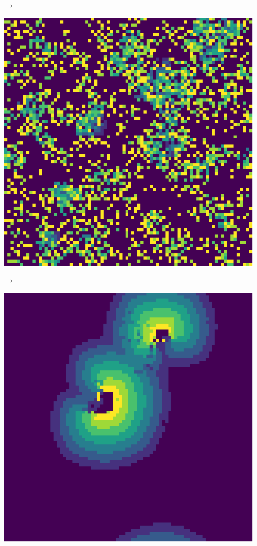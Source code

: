 \documentclass[12pt, a4paper]{article}
\begin{document}
\begin{center}
\begin{minipage}{.17\linewidth}
            \end{minipage}
            $\rightarrow$
            \begin{minipage}{.17\linewidth}
                \includegraphics[scale=0.15]{img/part2/step3.png}
            \end{minipage}
            $\rightarrow$
            \begin{minipage}{.17\linewidth}
                \includegraphics[scale=0.15]{img/part2/step4.png}

\end{minipage}
\end{center}
\end{document}
